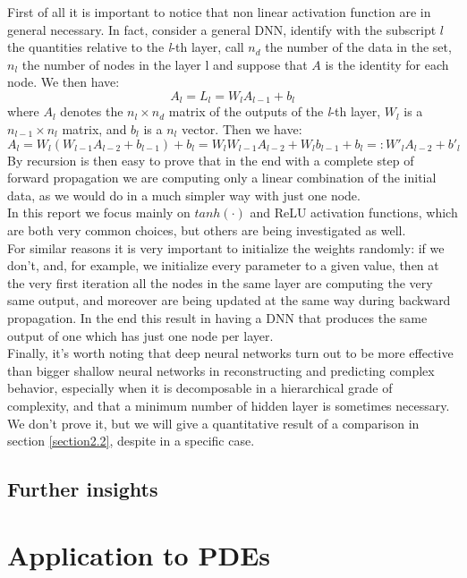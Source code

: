 \documentclass[12pt, a4paper]{report}
\theoremstyle{definition}
\begin{document}
First of all it is important to notice that non linear activation function are in general necessary. In fact, consider a general DNN, identify with the subscript $l$ the quantities relative to the \textit{l}-th layer, call $n_d$ the number of the data in the set, $n_l$ the number of nodes in the layer l and suppose that $A$ is the identity for each node. We then have:
\[
A_l = L_l = W_l A_{l-1} + b_l
\]
where $A_{l}$ denotes the $n_l \times n_d$ matrix of the outputs of the \textit{l}-th layer, $W_l$ is a $n_{l-1} \times n_l $ matrix, and $b_l$ is a $n_l$ vector. Then we have:
\[
A_l=W_l(W_{l-1}A_{l-2} + b_{l-1})+ b_l = W_lW_{l-1}A_{l-2}+W_lb_{l-1}+b_l =: W'_l A_{l-2} +  b'_l
\]
By recursion is then easy to prove that in the end with a complete step of forward propagation we are computing only a linear combination of the initial data, as we would do in a much simpler way with just one node.\\
In this report we focus mainly on $tanh(\cdot)$ and ReLU activation functions, which are both very common choices, but others are being investigated as well.\\
For similar reasons it is very important to initialize the weights randomly: if we don't, and, for example, we initialize every parameter to a given value, then at the very first iteration all the nodes in the same layer are computing the very same output, and moreover are being updated at the same way during backward propagation. In the end this result in having a DNN that produces the same output of one which has just one node per layer.\\
Finally, it's worth noting that deep neural networks turn out to be more effective than bigger shallow neural networks in reconstructing and predicting complex behavior, especially when it is decomposable in a hierarchical grade of complexity, and that a minimum number of hidden layer is sometimes necessary. We don't prove it, but we will give a quantitative result of a comparison in section \ref{section2.2}, despite in a specific case.


\section{Further insights}\label{section1.2}




\chapter{Application to PDEs}\label{chapter2}
\end{document}
